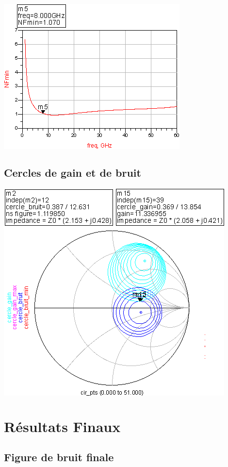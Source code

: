\documentclass{article}
\begin{document}
\begin{centering}
\includegraphics{nf.png}

\subsection{Cercles de gain et de bruit}

\includegraphics{cercles.png}

\newpage
\section{Résultats Finaux}
\subsection{Figure de bruit finale}


\end{centering}
\end{document}
